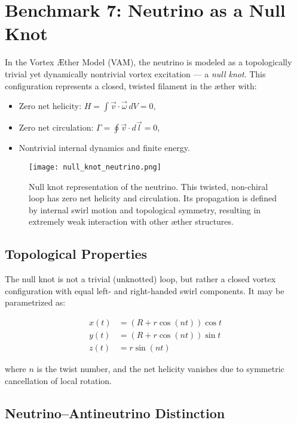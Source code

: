 \section{Benchmark 7: Neutrino as a Null Knot}

In the Vortex Æther Model (VAM), the neutrino is modeled as a topologically trivial yet dynamically nontrivial vortex excitation — a \emph{null knot}. This configuration represents a closed, twisted filament in the æther with:

\begin{itemize}
    \item Zero net helicity: \( H = \int \vec{v} \cdot \vec{\omega} \, dV = 0 \),
    \item Zero net circulation: \( \Gamma = \oint \vec{v} \cdot d\vec{l} = 0 \),
    \item Nontrivial internal dynamics and finite energy.
\end{itemize}

\begin{figure}[H]
    \centering
    \texttt{[image: null\_knot\_neutrino.png]}
    \caption{Null knot representation of the neutrino. This twisted, non-chiral loop has zero net helicity and circulation. Its propagation is defined by internal swirl motion and topological symmetry, resulting in extremely weak interaction with other æther structures.}
\end{figure}

\subsection{Topological Properties}

The null knot is not a trivial (unknotted) loop, but rather a closed vortex configuration with equal left- and right-handed swirl components. It may be parametrized as:

\begin{equation}
\begin{aligned}
x(t) &= \left( R + r \cos(n t) \right) \cos t \\
y(t) &= \left( R + r \cos(n t) \right) \sin t \\
z(t) &= r \sin(n t)
\end{aligned}
\end{equation}

where \(n\) is the twist number, and the net helicity vanishes due to symmetric cancellation of local rotation.

\subsection{Neutrino–Antineutrino Distinction}

